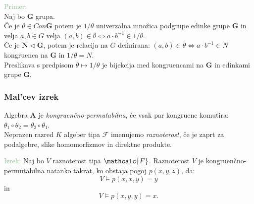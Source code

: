 \documentclass{beamer}
\begin{document}
\begin{frame}
    \textcolor{darkseagreen}{Primer:}\\
Naj bo $\mathbf{G}$ grupa. \\
Če je $\theta \in Con \mathbf{G}$ potem je $1/ \theta$ 
univerzalna množica podgrupe edinke grupe $\mathbf{G}$ in velja
$a, b \in G$ velja $\left(a, b\right) \in \theta \Leftrightarrow a \cdot b^{-1} \in 1/\theta$.\\
Če je $\mathbf{N} \vartriangleleft \mathbf{G}$, potem je relacija na $G$ definirana:
$\left(a,b\right) \in \theta \Leftrightarrow a \cdot b^{-1} \in N$ kongruenca na $\mathbf{G}$ in $1/\theta= N$.\\
Preslikava s predpisom $\theta \mapsto 1/\theta$ je bijekcija med kongruencami na $\mathbf{G}$ in edinkami grupe $\mathbf{G}$.\\
\end{frame}

\begin{frame}
\frametitle{Mal'cev izrek}
Algebra $\mathbf{A}$ je \emph{kongruenčno-permutabilna}, če vsak par kongruenc komutira: \\
$\theta_1 \circ \theta_2 = \theta_2 \circ \theta_1$.\\
Neprazen razred $K$ algeber tipa $\mathcal{F}$ imenujemo \emph{raznoterost}, če je zaprt za podalgebre, 
slike homomorfizmov in direktne produkte.
\pause
\begin{block}{}
\textcolor{darkseagreen}{Izrek:} Naj bo $V$ raznoterost tipa $\mathcalc{F}$. Raznoterost $V$ je kongruenčno-permutabilna
natanko takrat, ko obstaja pogoj $p\left(x, y, z\right)$, da: \\ $$V \models p\left(x,x,y\right)=y$$ in $$V \models p\left(x,y,y\right)=x.$$
\end{block}

\end{frame}
\end{document}
